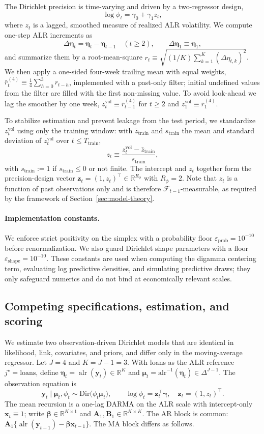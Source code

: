 \documentclass[12pt]{article}
\newcommand{\alrinv}{\mathrm{alr}^{-1}}
\newcommand{\epsprob}{\varepsilon_{\text{prob}}}
\newcommand{\epsshape}{\varepsilon_{\text{shape}}}
\newcommand{\calF}{\mathcal{F}}
\theoremstyle{remark}
\newcommand{\R}{\mathbb{R}}
\newcommand{\Dir}{\mathrm{Dir}}
\newcommand{\alr}{\operatorname{alr}}
\newcommand{\bfmu}{\boldsymbol{\mu}}
\newcommand{\bfeta}{\boldsymbol{\eta}}
\newcommand{\bfbeta}{\boldsymbol{\beta}}
\newcommand{\bfgamma}{\boldsymbol{\gamma}}
\newcommand{\bfA}{\mathbf{A}}
\newcommand{\bfB}{\mathbf{B}}
\newcommand{\bfx}{\mathbf{x}}
\newcommand{\bfz}{\mathbf{z}}
\newcommand{\bfy}{\mathbf{y}}
\begin{document}
The Dirichlet precision is time-varying and driven by a two-regressor design,
\[
\log\phi_t = \gamma_0 + \gamma_1 z_t,
\]
where $z_t$ is a lagged, smoothed measure of realized ALR volatility. We compute one-step ALR increments as
\[
\Delta\bfeta_t = \bfeta_t-\bfeta_{t-1}\quad(t\ge 2),\qquad \Delta\bfeta_1\equiv\bfeta_1,
\]
and summarize them by a root-mean-square $r_t\equiv\sqrt{(1/K)\sum_{k=1}^K(\Delta\eta_{t,k})^2}$. We then apply a one-sided four-week trailing mean with equal weights, $\bar r_t^{(4)}\equiv\tfrac{1}{4}\sum_{h=0}^3 r_{t-h}$, implemented with a past-only filter; initial undefined values from the filter are filled with the first non-missing value. To avoid look-ahead we lag the smoother by one week, $z_t^{\text{vol}}\equiv\bar r_{t-1}^{(4)}$ for $t\ge 2$ and $z_1^{\text{vol}}\equiv\bar r_1^{(4)}$.

To stabilize estimation and prevent leakage from the test period, we standardize $z_t^{\text{vol}}$ using only the training window: with $\bar z_{\text{train}}$ and $s_{\text{train}}$ the mean and standard deviation of $z_t^{\text{vol}}$ over $t\le T_{\text{train}}$,
\[
z_t \equiv \frac{z_t^{\text{vol}}-\bar z_{\text{train}}}{s_{\text{train}}},
\]
with $s_{\text{train}}:=1$ if $s_{\text{train}}\le 0$ or not finite. The intercept and $z_t$ together form the precision-design vector $\bfz_t=(1,z_t)^\top\in\R^{R_\phi}$ with $R_\phi=2$. Note that $z_t$ is a function of past observations only and is therefore $\calF_{t-1}$-measurable, as required by the framework of Section~\ref{sec:model-theory}.

\paragraph{Implementation constants.} We enforce strict positivity on the simplex with a probability floor $\epsprob=10^{-10}$ before renormalization. We also guard Dirichlet shape parameters with a floor $\epsshape=10^{-10}$. These constants are used when computing the digamma centering term, evaluating log predictive densities, and simulating predictive draws; they only safeguard numerics and do not bind at economically relevant scales.

\subsection{Competing specifications, estimation, and scoring}\label{sec:spec-est}

We estimate two observation-driven Dirichlet models that are identical in likelihood, link, covariates, and priors, and differ only in the moving-average regressor. Let $J=4$ and $K=J-1=3$. With loans as the ALR reference $j^\star=\text{loans}$, define $\bfeta_t=\alr(\bfy_t)\in\R^K$ and $\bfmu_t=\alrinv(\bfeta_t)\in\Delta^{J-1}$. The observation equation is
\[
\bfy_t \mid \bfmu_t,\phi_t \sim \Dir\!\big(\phi_t\bfmu_t\big),\qquad
\log\phi_t=\bfz_t^\top\bfgamma,\quad \bfz_t=(1,z_t)^\top.
\]
The mean recursion is a one-lag DARMA on the ALR scale with intercept-only $\bfx_t\equiv 1$; write $\bfbeta\in\R^{K\times 1}$ and $\bfA_1,\bfB_1\in\R^{K\times K}$. The AR block is common: $\bfA_1\{\alr(\bfy_{t-1})-\bfbeta\bfx_{t-1}\}$. The MA block differs as follows.
\end{document}
